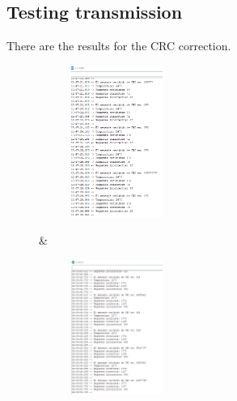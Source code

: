 \subsection{Testing transmission}
There are the results for the CRC correction.

\begin{figure}
	\centering
	\begin{tabular}
		\begin{subfigure}{.2\textwidth}
			\includegraphics[width=3cm]{images/10cm_p1.png}
		\end{subfigure} &
		\begin{subfigure}{.2\textwidth}
			\includegraphics[width=3cm]{images/10cm_p2.png}
		\end{subfigure}
	\end{tabular}
\end{figure}